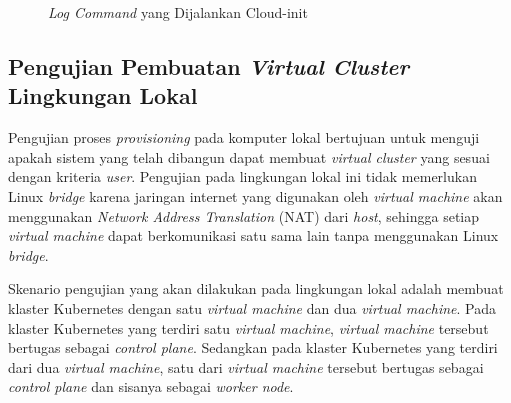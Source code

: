 \begin{figure}[H]
  \centering
  \caption{\emph{Log Command} yang Dijalankan Cloud-init}
  \label{fig:log-output-cloud-init}
\end{figure}
\subsection{Pengujian Pembuatan \emph{Virtual Cluster} Lingkungan Lokal}

\label{subsec:pengujian-pembuatan-vc}

Pengujian proses \emph{provisioning} pada komputer lokal bertujuan untuk
menguji apakah sistem yang telah dibangun dapat membuat \emph{virtual cluster}
yang sesuai dengan kriteria \emph{user}. Pengujian pada lingkungan lokal ini
tidak memerlukan Linux \emph{bridge} karena jaringan internet yang digunakan
oleh \emph{virtual machine} akan menggunakan \emph{Network Address Translation} (NAT)
dari \emph{host}, sehingga setiap \emph{virtual machine} dapat berkomunikasi satu sama
lain tanpa menggunakan Linux \emph{bridge}.

Skenario pengujian yang akan dilakukan pada lingkungan lokal adalah
membuat klaster Kubernetes dengan satu \emph{virtual machine} dan dua \emph{virtual machine}.
Pada klaster Kubernetes yang terdiri satu \emph{virtual machine}, \emph{virtual machine}
tersebut bertugas sebagai \emph{control plane}. Sedangkan pada klaster Kubernetes yang terdiri
dari dua \emph{virtual machine}, satu dari \emph{virtual machine} tersebut bertugas sebagai
\emph{control plane} dan sisanya sebagai \emph{worker node}.

